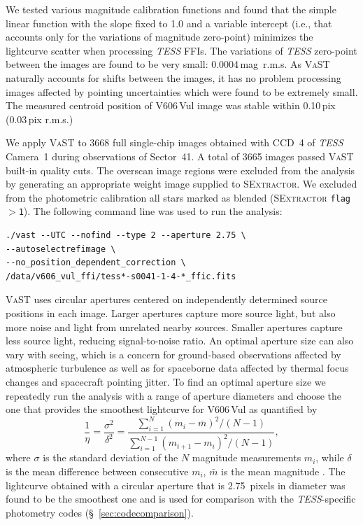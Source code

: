 \documentclass[twocolumn]{aastex631}
\newcommand{\nova}{V606\,Vul}
\begin{document}
We tested various magnitude calibration functions and found that the simple
linear function with the slope fixed to 1.0 and a variable intercept 
(i.e., that accounts only for the variations of magnitude zero-point)
minimizes the lightcurve scatter when processing {\em TESS} FFIs.
The variations of {\em TESS} zero-point between the images are found to be
very small: 0.0004\,mag~r.m.s.
As \textsc{VaST} naturally accounts for shifts between the images, 
it has no problem processing images affected by pointing uncertainties 
which were found to be extremely small.
The measured centroid position of \nova{} image was stable within 0.10\,pix (0.03\,pix r.m.s.) 

We apply \textsc{VaST} to 3668 full single-chip images obtained 
with CCD~4 of {\em TESS} Camera~1 during observations of Sector~41.
A total of 3665 images passed \textsc{VaST} built-in quality cuts.
The overscan image regions were excluded from the analysis by
generating an appropriate weight image supplied to \textsc{SExtractor}.
We excluded from the photometric calibration all stars marked as blended 
(\textsc{SExtractor} \texttt{flag$>$1}).
The following command line was used to run the analysis:

\begin{verbatim}
./vast --UTC --nofind --type 2 --aperture 2.75 \
--autoselectrefimage \
--no_position_dependent_correction \
/data/v606_vul_ffi/tess*-s0041-1-4-*_ffic.fits
\end{verbatim}

\textsc{VaST} uses circular apertures centered on independently determined source positions in each image. 
Larger apertures capture more source light, but also more noise and light from unrelated nearby sources. 
Smaller apertures capture less source light, reducing signal-to-noise ratio. 
An optimal aperture size can also vary with seeing, which is a concern for ground-based observations 
affected by atmospheric turbulence as well as for spaceborne data affected by thermal focus changes 
and spacecraft pointing jitter. To find an optimal aperture size we repeatedly run the analysis with
a range of aperture diameters and choose the one that provides the smoothest
lightcurve for \nova{} as quantified by 
\begin{equation}
\frac{1}{\eta} = \frac{\sigma^{2}}{\delta^{2}} = \frac{ \sum\limits_{i=1}^N (m_i-\bar{m})^2  / (N - 1)}{\sum\limits_{i=1}^{N-1}(m_{i+1} - m_{i})^2 / (N - 1)},
\label{eq:1overeta}
\end{equation}
where $\sigma$ is the standard deviation of the $N$ magnitude
measurements $m_{i}$, while $\delta$ is the mean difference between consecutive $m_{i}$, 
$\bar{m}$ is the mean magnitude 
\citep{vonneumann1941,vonneumann1942,2017MNRAS.464..274S,2022ApJ...940...19C}.
The lightcurve obtained with a circular aperture that is 2.75~pixels in diameter
was found to be the smoothest one and is used for comparison with 
the {\em TESS}-specific photometry codes (\S~\ref{sec:codecomparison}).
\end{document}
